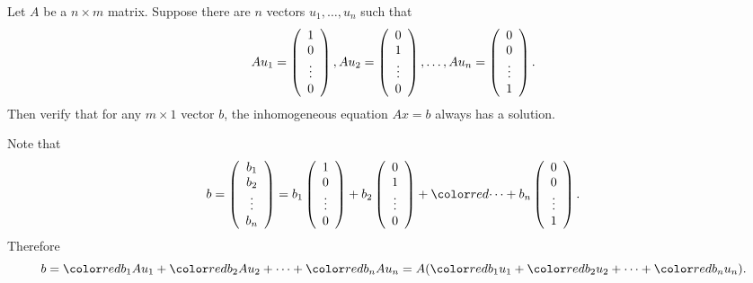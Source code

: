 \documentclass{ximera}
\begin{document}
\begin{exercise} \label{YZ_3.4.4}
Let $A$ be a $n\times m$ matrix.  Suppose there are $n$ vectors $u_1,\ldots,u_n$ such that 
\[
Au_1=\left(\begin{array}{cccccccccccc}  1 \\ 0 \\ \vdots \\ 0 \end{array}\right), Au_2=\left(\begin{array}{cccccccccccc}  0 \\ 1 \\ \vdots \\ 0 \end{array}\right), \ldots, Au_n=\left(\begin{array}{cccccccccccc} 0\\ 0 \\ \vdots \\ 1 \end{array}\right) .
\]
Then verify that for any $m\times 1$ vector $b$, the inhomogeneous equation $Ax=b$ always has a solution.

\begin{solution}
\soln 
Note that 
\[
b = \Matrixc{b_1 \\ b_2 \\ \vdots \\ b_n} = 
b_1\Matrixc{1 \\ 0 \\ \vdots \\ 0}+b_2\Matrixc{ 0 \\ 1 \\ \vdots \\ 0}+\RED{\cdots}+b_n\Matrixc{ 0 \\ 0 \\ \vdots \\ 1}.
\]
Therefore
\[
b = \RED{b_1}Au_1 +  \RED{b_2}Au_2 + \cdots +  \RED{b_n}Au_n=
A( \RED{b_1}u_1 +  \RED{b_2}u_2+\cdots +  \RED{b_n}u_n).
\]
\end{solution}
\end{exercise}
\end{document}
